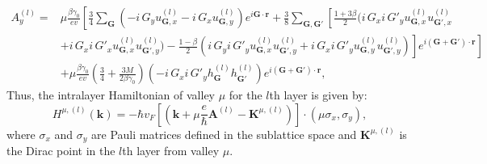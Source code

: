 \documentclass[aps,prx,10pt,twocolumn,superscriptaddress]{revtex4}
\begin{document}
\begin{widetext}
\begin{align}
A^{(l)}_{y}=&\mu\frac{\beta\gamma_{0}}{ev}\left[\frac{3}{4}\sum_{\textbf{G}}(-i\,G_{y}u^{(l)}_{\textbf{G},x}-i\,G_{x}u^{(l)}_{\textbf{G},y})e^{i\textbf{G}\cdot\textbf{r}}+\frac{3}{8}\sum_{\textbf{G},\textbf{G}'}\left[\frac{1+3\beta}{2}(i\,G_{x}i\,G'_{y}u^{(l)}_{\textbf{G},x}u^{(l)}_{\textbf{G}',x}\right.\right.\nonumber\\
&+\left.\left.i\,G_{x}i\,G'_{x}u^{(l)}_{\textbf{G},x}u^{(l)}_{\textbf{G}',y})-\frac{1-\beta}{2}(i\,G_{y}i\,G'_{y}u^{(l)}_{\textbf{G},x}u^{(l)}_{\textbf{G}',y}+i\,G_{x}i\,G'_{y}u^{(l)}_{\textbf{G},y}u^{(l)}_{\textbf{G}',y})\right]e^{i(\textbf{G}+\textbf{G}')\cdot\textbf{r}}\right]\nonumber\\
&+\mu\frac{\beta\gamma_{0}}{ev}\left(\frac{3}{4}+\frac{3M}{2\beta\gamma_{0}}\right)(-i\,G_{x}i\,G'_{y}h^{(l)}_{\textbf{G}}h^{(l)}_{\textbf{G}'})e^{i(\textbf{G}+\textbf{G}')\cdot\textbf{r}},
\end{align}
Thus, the intralayer Hamiltonian of valley $\mu$ for the $l$th layer is given by:
\begin{equation}
H^{\mu,(l)}(\textbf{k})=-\hbar v_{F}\left[\left(\textbf{k}+\mu\frac{e}{\hbar}\textbf{A}^{(l)}-\textbf{K}^{\mu,(l)}\right)\right]\cdot(\mu\sigma_{x},\sigma_{y}),
\end{equation}
where $\sigma_{x}$ and $\sigma_{y}$ are Pauli matrices defined in the sublattice space and $\textbf{K}^{\mu,(l)}$ is the Dirac point in the $l$th layer from valley $\mu$.


\end{widetext}



\end{document}
